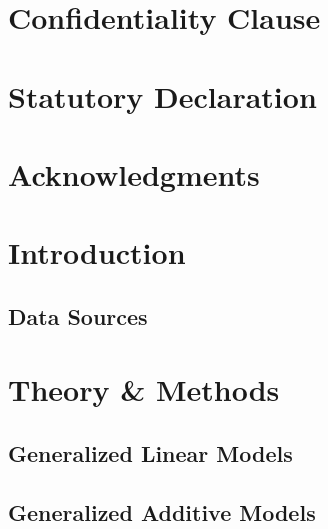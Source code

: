 \documentclass[12pt]{article}
\numberwithin{equation}{section}
\numberwithin{table}{section}
\numberwithin{figure}{section}
\begin{document}
\thispagestyle{empty}	



\newpage
\null\thispagestyle{empty}
\newpage
\thispagestyle{empty}
\section*{Confidentiality Clause}


\newpage
\null\thispagestyle{empty}
\newpage
\thispagestyle{empty}
\section*{Statutory Declaration}




\newpage
\null\thispagestyle{empty}
\newpage
\thispagestyle{empty}
\section*{Acknowledgments}

\newpage
\null\thispagestyle{empty}
\newpage


	
\thispagestyle{empty}
\tableofcontents
\newpage




\newpage

\setcounter{page}{1} 

\section{Introduction} \label{introduction}

\subsection{Data Sources} \label{data_sources}

\clearpage

\section{Theory \& Methods} \label{theory_and_methods}

\subsection{Generalized Linear Models} \label{glm}

\subsection{Generalized Additive Models} \label{gam}
\end{document}
